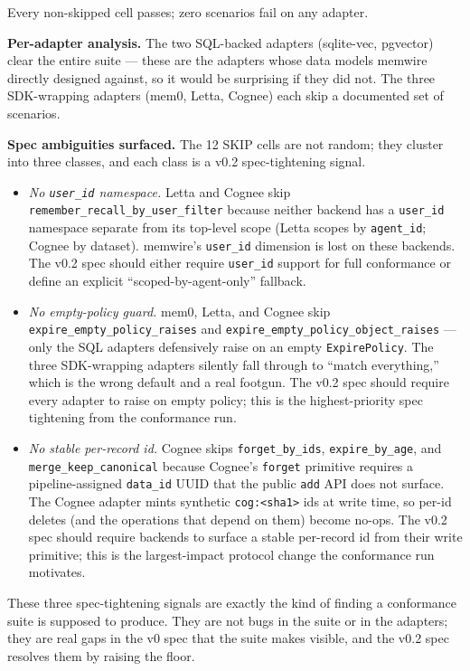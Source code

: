 \documentclass[11pt,letterpaper,twocolumn]{article}
\begin{document}
Every non-skipped cell passes; zero scenarios fail on any adapter.

\textbf{Per-adapter analysis.} The two SQL-backed adapters (sqlite-vec, pgvector) clear the entire suite --- these are the adapters whose data models memwire directly designed against, so it would be surprising if they did not. The three SDK-wrapping adapters (mem0, Letta, Cognee) each skip a documented set of scenarios.

\textbf{Spec ambiguities surfaced.} The 12 SKIP cells are not random; they cluster into three classes, and each class is a v0.2 spec-tightening signal.

\begin{itemize}[leftmargin=*]
  \item \emph{No \texttt{user\_id} namespace.} Letta and Cognee skip \texttt{remember\_recall\_by\_user\_filter} because neither backend has a \texttt{user\_id} namespace separate from its top-level scope (Letta scopes by \texttt{agent\_id}; Cognee by dataset). memwire's \texttt{user\_id} dimension is lost on these backends. The v0.2 spec should either require \texttt{user\_id} support for full conformance or define an explicit ``scoped-by-agent-only'' fallback.
  \item \emph{No empty-policy guard.} mem0, Letta, and Cognee skip \texttt{expire\_empty\_policy\_raises} and \texttt{expire\_empty\_policy\_object\_raises} --- only the SQL adapters defensively raise on an empty \texttt{ExpirePolicy}. The three SDK-wrapping adapters silently fall through to ``match everything,'' which is the wrong default and a real footgun. The v0.2 spec should require every adapter to raise on empty policy; this is the highest-priority spec tightening from the conformance run.
  \item \emph{No stable per-record id.} Cognee skips \texttt{forget\_by\_ids}, \texttt{expire\_by\_age}, and \texttt{merge\_keep\_canonical} because Cognee's \texttt{forget} primitive requires a pipeline-assigned \texttt{data\_id} UUID that the public \texttt{add} API does not surface. The Cognee adapter mints synthetic \texttt{cog:<sha1>} ids at write time, so per-id deletes (and the operations that depend on them) become no-ops. The v0.2 spec should require backends to surface a stable per-record id from their write primitive; this is the largest-impact protocol change the conformance run motivates.
\end{itemize}

These three spec-tightening signals are exactly the kind of finding a conformance suite is supposed to produce. They are not bugs in the suite or in the adapters; they are real gaps in the v0 spec that the suite makes visible, and the v0.2 spec resolves them by raising the floor.
\end{document}
